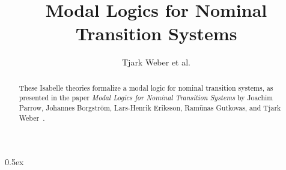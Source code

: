\documentclass[11pt,a4paper]{article}
\begin{document}
\title{Modal Logics for Nominal Transition Systems}

\author{Tjark Weber et al.}

\maketitle

\begin{abstract}
  These Isabelle theories formalize a modal logic for nominal
  transition systems, as presented in the paper \emph{Modal Logics for
    Nominal Transition Systems} by Joachim Parrow, Johannes
  Borgstr{\"o}m, Lars-Henrik Eriksson, Ram{\=u}nas Gutkovas, and Tjark
  Weber~\cite{DBLP:conf/concur/ParrowBEGW15}.
\end{abstract}

\tableofcontents

\parindent 0pt\parskip 0.5ex

\cleardoublepage





\end{document}

